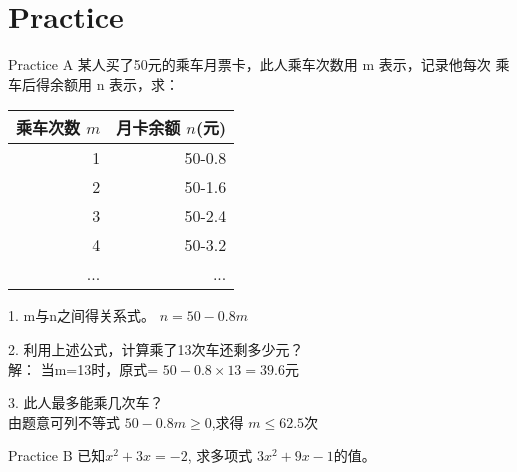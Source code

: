 \documentclass{beamer}
\begin{document}
	\section{Practice}
	\begin{frame}{Practice A}
		某人买了50元的乘车月票卡，此人乘车次数用 m 表示，记录他每次					乘车后得余额用 n 表示，求：
		\begin{table}[H]
			\begin{tabular}{|rr|}
				\hline
					乘车次数 $m$ & 月卡余额 $n$(元)  \\
				\hline
					1 & 50-0.8  \\
					2 & 50-1.6 \\
					3 & 50-2.4 \\
					4 & 50-3.2 \\
					...& ... \\
				\hline
			
			\end{tabular}%
		\end{table}

			1. m与n之间得关系式。\pause \qquad
				$ n = 50 - 0.8m $
			
			2. 利用上述公式，计算乘了13次车还剩多少元？
				\pause \\
				解： 当m=13时，原式= $ 50 - 0.8\times13 = 39.6 $元
				
			3. 此人最多能乘几次车？
				\pause \\
				由题意可列不等式 $50 - 0.8m\geq0$,求得 $m\leq62.5$次
	\end{frame}
	
	\begin{frame}{Practice B}
		已知$ x^2 + 3x = -2$, 求多项式 $3x^2 + 9x -1 $的值。
	\end{frame}
	
\end{document}
